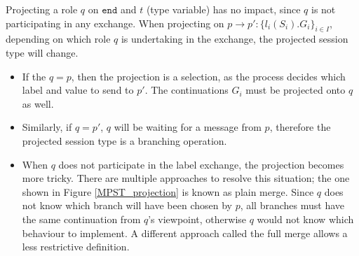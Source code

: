 \documentclass[12pt,twoside]{report}
\begin{document}
Projecting a role $q$ on $\texttt{end}$ and $t$ (type variable) has no impact, since $q$ is not participating in any exchange. When projecting on $p \longrightarrow p':\{l_i(S_i).G_i\}_{i \in I}$, depending on which role $q$ is undertaking in the exchange, the projected session type will change. 
\begin{itemize}
    \item If the $q = p$, then the projection is a selection, as the process decides which label and value to send to $p'$. The continuations $G_i$ must be projected onto $q$ as well.
    \item Similarly, if $q = p'$, $q$ will be waiting for a message from $p$, therefore the projected session type is a branching operation. 
    \item  When $q$ does not participate in the label exchange, the projection becomes more tricky. There are multiple approaches to resolve this situation; the one shown in Figure \ref{MPST_projection} is known as plain merge. Since $q$ does not know which branch will have been chosen by $p$, all branches must have the same continuation from $q$'s viewpoint, otherwise $q$ would not know which behaviour to implement. A different approach called the full merge allows a less restrictive definition\cite{verygentleintrotompst}.
    
\end{itemize}
\end{document}
